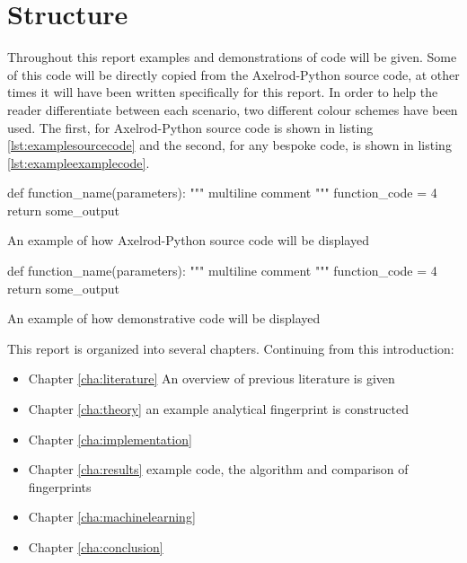 \section{Structure}

Throughout this report examples and demonstrations of code will be given.
Some of this code will be directly copied from the Axelrod-Python source code, at other times it will have been written specifically for this report.
In order to help the reader differentiate between each scenario, two different colour schemes have been used.
The first, for Axelrod-Python source code is shown in listing \ref{lst:examplesourcecode} and the second, for any bespoke code, is shown in listing \ref{lst:exampleexamplecode}.

\begin{listing}[hbtp!]
\begin{SourceCode}
def function_name(parameters):
    """
    multiline comment
    """
    function_code = 4
    return some_output
\end{SourceCode}
\caption{An example of how Axelrod-Python source code will be displayed}
\label{lst:examplesourcecode}
\end{listing}

\begin{listing}[hbtp!]
\begin{ExampleCode}
def function_name(parameters):
    """
    multiline comment
    """
    function_code = 4
    return some_output
\end{ExampleCode}
\caption{An example of how demonstrative code will be displayed}
\label{lst:exampleexamplecode}
\end{listing}{}

This report is organized into several chapters. Continuing from this introduction:

\begin{itemize}
    \item Chapter \ref{cha:literature} An overview of previous literature is given
    \item Chapter \ref{cha:theory} an example analytical fingerprint is constructed
    \item Chapter \ref{cha:implementation}
    \item Chapter \ref{cha:results} example code, the algorithm and comparison of fingerprints
    \item Chapter \ref{cha:machinelearning}
    \item Chapter \ref{cha:conclusion}
\end{itemize}


